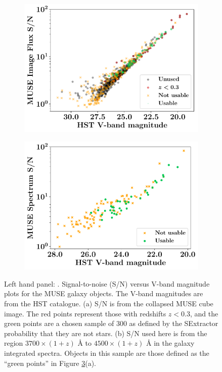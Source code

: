 \documentclass[12pt, twocolumn]{revtex4}    %
\begin{document}
\begin{figure}
  \begin{subfigure}[b]{0.495\textwidth}
    \includegraphics[width=\textwidth]{data/image_sn_vs_vband}
    \label{fig:image_sn_vband}
  \end{subfigure}
  \begin{subfigure}[b]{0.495\textwidth}
    \includegraphics[width=\textwidth]{data/sn_vs_vband}
    \label{fig:spec_sn_vband}
  \end{subfigure}
  \captionsetup{justification=raggedright}
  \caption[HUDF Objects]{Left hand panel: . Signal-to-noise (S/N) versus V-band magnitude plots for the MUSE galaxy objects. The V-band magnitudes are from the HST catalogue. (a) S/N is from the collapsed MUSE cube image. The red points represent those with redshifts $z<0.3$, and the green points are a chosen sample of 300 as defined by the SExtractor probability that they are not stars. (b) S/N used here is from the region $3700\times(1+z)$ {\AA} to $4500\times(1+z)$ {\AA} in the galaxy integrated spectra. Objects in this sample are those defined as the ``green points'' in Figure \ref{fig:sn_vband}(a).}
\label{fig:sn_vband}
\end{figure}
\end{document}

